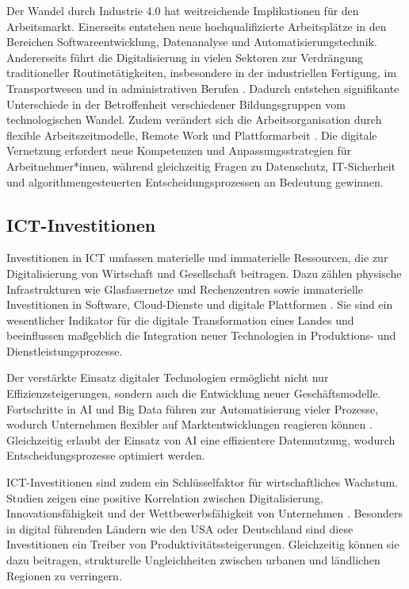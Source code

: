 Der Wandel durch Industrie 4.0 hat weitreichende Implikationen für den Arbeitsmarkt. 
Einerseits entstehen neue hochqualifizierte Arbeitsplätze in den Bereichen 
Softwareentwicklung, Datenanalyse und Automatisierungstechnik. Andererseits führt die 
Digitalisierung in vielen Sektoren zur Verdrängung traditioneller Routinetätigkeiten, 
insbesondere in der industriellen Fertigung, im Transportwesen und in administrativen 
Berufen \parencite[vgl.][S. 40]{frey2013thefuture}. Dadurch entstehen signifikante 
Unterschiede in der Betroffenheit verschiedener Bildungsgruppen vom technologischen Wandel. 
Zudem verändert sich die Arbeitsorganisation durch flexible Arbeitszeitmodelle, Remote 
Work und Plattformarbeit \parencite[vgl.][S. 112]{schwab2016thefourth}. Die digitale 
Vernetzung erfordert neue Kompetenzen und Anpassungsstrategien für Arbeitnehmer*innen, 
während gleichzeitig Fragen zu Datenschutz, IT-Sicherheit und algorithmengesteuerten 
Entscheidungsprozessen an Bedeutung gewinnen.


\subsection{ICT-Investitionen}

Investitionen in \ac{ICT} umfassen materielle und immaterielle Ressourcen, die zur 
Digitalisierung von Wirtschaft und Gesellschaft beitragen. Dazu zählen physische 
Infrastrukturen wie Glasfasernetze und Rechenzentren sowie immaterielle Investitionen in 
Software, Cloud-Dienste und digitale Plattformen 
\parencite[vgl.][S. 15ff]{oecd2019measuring}. Sie sind ein wesentlicher Indikator für die 
digitale Transformation eines Landes und beeinflussen maßgeblich die Integration neuer 
Technologien in Produktions- und Dienstleistungsprozesse.

Der verstärkte Einsatz digitaler Technologien ermöglicht nicht nur Effizienzsteigerungen, 
sondern auch die Entwicklung neuer Geschäftsmodelle. Fortschritte in \ac{AI} und Big Data 
führen zur Automatisierung vieler Prozesse, wodurch Unternehmen flexibler auf 
Marktentwicklungen reagieren können \parencite[vgl.][S. 15ff]{oecd2019measuring}. 
Gleichzeitig erlaubt der Einsatz von \ac{AI} eine effizientere Datennutzung, wodurch 
Entscheidungsprozesse optimiert werden.

\ac{ICT}-Investitionen sind zudem ein Schlüsselfaktor für wirtschaftliches Wachstum. 
Studien zeigen eine positive Korrelation zwischen Digitalisierung, Innovationsfähigkeit 
und der Wettbewerbsfähigkeit von Unternehmen 
\parencite[vgl.][S. 22]{brynjolfsson2014thesecond}. Besonders in digital führenden Ländern 
wie den USA oder Deutschland sind diese Investitionen ein Treiber von 
Produktivitätssteigerungen. Gleichzeitig können sie dazu beitragen, strukturelle 
Ungleichheiten zwischen urbanen und ländlichen Regionen zu verringern.

